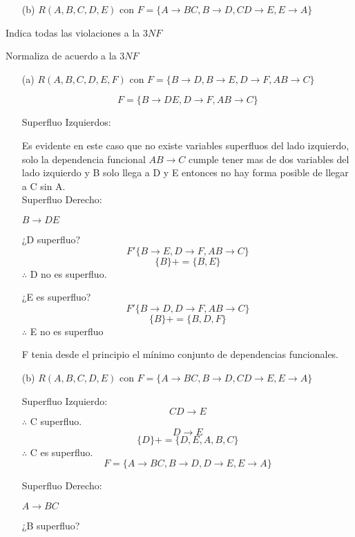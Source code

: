 \documentclass{article}
\begin{document}
\begin{enumerate}
\begin{enumerate}
        \item[(b)] $ R(A,B,C,D,E)$ con $F = \{A \rightarrow BC, B \rightarrow D,
        CD \rightarrow E, E \rightarrow A\}$

      \end{enumerate}

    Indica todas las violaciones a la $3NF$

    Normaliza de acuerdo a la $3NF$

    \begin{enumerate}
      \item[(a)] $R(A,B,C,D,E,F)$ con $F = \{B \rightarrow D, B \rightarrow E,
      D \rightarrow F, AB \rightarrow C\}$

      $$F=\{B \rightarrow DE, D \rightarrow F, AB \rightarrow C\}$$


      Superfluo Izquierdos:

      Es evidente en este caso que no existe variables superfluos del lado
      izquierdo, solo la dependencia funcional $AB \rightarrow C$  cumple tener
      mas de dos variables del lado izquierdo y B solo llega a D y E entonces no hay forma posible de llegar a C sin A.\\


      Superfluo Derecho:

      $B \rightarrow DE$

      ¿D superfluo?
      $$F'\{B \rightarrow E, D \rightarrow F, AB \rightarrow C\}$$
      $$\{B\}+=\{B,E\}$$
      $\therefore $ D no es superfluo.


      ¿E es superfluo?
      $$F'\{B \rightarrow D, D \rightarrow F, AB \rightarrow C\}$$
      $$\{B\}+=\{B,D,F\}$$
      $\therefore$ E no es superfluo

      F tenia desde el principio el mínimo conjunto de dependencias funcionales.

      \item[(b)] $R(A,B,C,D,E)$ con $F = \{A \rightarrow BC, B \rightarrow D,
      CD \rightarrow E, E \rightarrow A\}$

      Superfluo Izquierdo:
      $$CD \rightarrow E$$
      $\therefore$ C superfluo.
      $$D \rightarrow E$$
      $$\{D\}+=\{D,E,A,B,C\}$$
      $\therefore$ C es superfluo.
      $$F=\{A \rightarrow BC, B\rightarrow D, D\rightarrow E, E \rightarrow A\}$$

      Superfluo Derecho:

      $A\rightarrow BC$

      ¿B superfluo?


\end{enumerate}
\end{enumerate}
\end{document}
